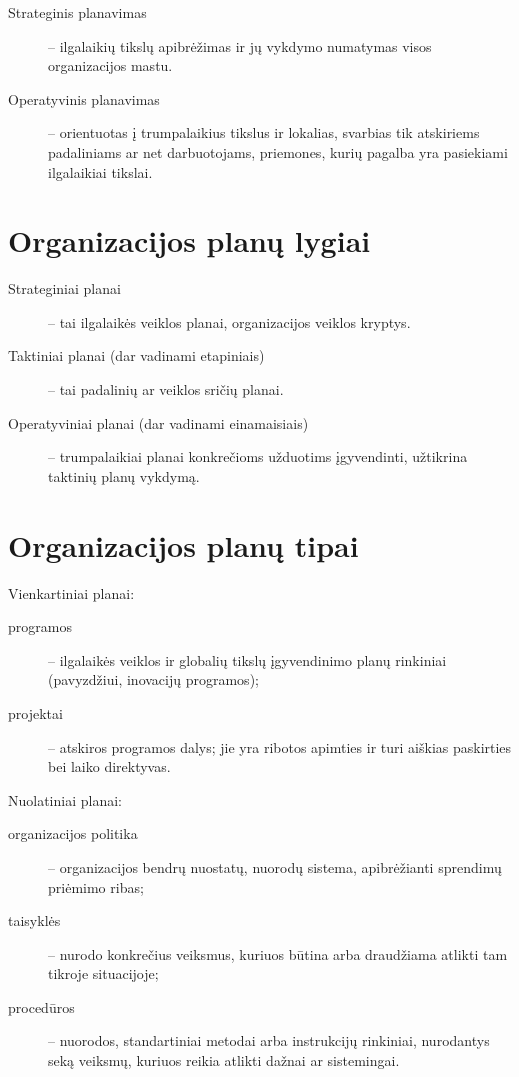\begin{description}
  \item[Strateginis planavimas] – ilgalaikių tikslų apibrėžimas ir jų
    vykdymo numatymas visos organizacijos mastu.
  \item[Operatyvinis planavimas] – orientuotas į trumpalaikius tikslus
    ir lokalias, svarbias tik atskiriems padaliniams ar net darbuotojams,
    priemones, kurių pagalba yra pasiekiami ilgalaikiai tikslai.
\end{description}

\section{Organizacijos planų lygiai}

\begin{description}
  \item[Strateginiai planai] – tai ilgalaikės veiklos planai, organizacijos
    veiklos kryptys.
  \item[Taktiniai planai (dar vadinami etapiniais)] – tai padalinių
    ar veiklos sričių planai.
  \item[Operatyviniai planai (dar vadinami einamaisiais)] – trumpalaikiai
    planai konkrečioms užduotims įgyvendinti, užtikrina taktinių planų
    vykdymą.
\end{description}

\section{Organizacijos planų tipai}

Vienkartiniai planai:
\begin{description}
  \item[programos] – ilgalaikės veiklos ir globalių tikslų įgyvendinimo
    planų rinkiniai (pavyzdžiui, inovacijų programos);
  \item[projektai] – atskiros programos dalys; jie yra ribotos apimties
    ir turi aiškias paskirties bei laiko direktyvas.
\end{description}

Nuolatiniai planai:
\begin{description}
  \item[organizacijos politika] – organizacijos bendrų nuostatų, nuorodų
    sistema, apibrėžianti sprendimų priėmimo ribas;
  \item[taisyklės] – nurodo konkrečius veiksmus, kuriuos būtina arba
    draudžiama atlikti tam tikroje situacijoje;
  \item[procedūros] – nuorodos, standartiniai metodai arba instrukcijų
    rinkiniai, nurodantys seką veiksmų, kuriuos reikia atlikti dažnai
    ar sistemingai.
\end{description}

